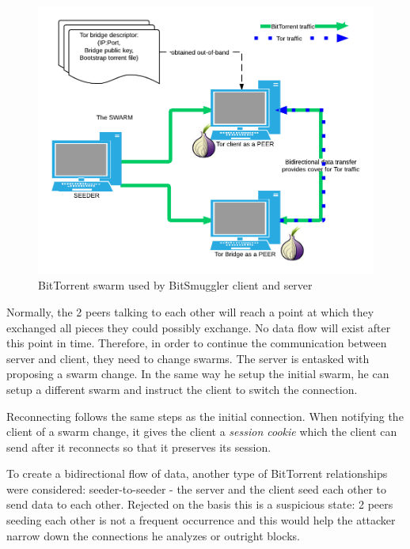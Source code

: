 \documentclass[11pt]{book} %
\newcommand{\projectName}{BitSmuggler }
\begin{document}
\begin{figure}[h!]
\begin{center}
\includegraphics[scale=0.4]{torswarm}
\end{center}
 \caption{BitTorrent swarm used by \projectName client and server}
 \label{fig:torSwarm}
 \end{figure}

Normally, the 2 peers talking to each other will reach a point at which they exchanged all pieces they could possibly exchange. No data flow will exist after this point in time. Therefore, in order to continue the communication between server and client, they need to change swarms. The server is entasked with proposing a swarm change. In the same way he setup the initial swarm, he can setup a different swarm and instruct the client to switch the connection.

Reconnecting follows the same steps as the initial connection. When notifying the client of a swarm change, it gives the client a \textit{session cookie} which the client can send after it reconnects so that it preserves its session.

To create a bidirectional flow of data, another type of BitTorrent relationships were considered: seeder-to-seeder - the server and the client seed each other to send data to each other. Rejected on the basis this is a suspicious state: 2 peers seeding each other is not a frequent occurrence and this would help the attacker narrow down the connections he analyzes or outright blocks.
\end{document}
